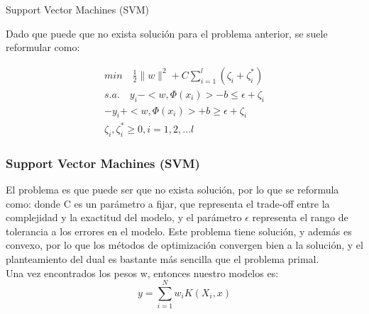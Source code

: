 \documentclass[spanish,xcolor=table]{beamer}
\begin{document}
\begin{section}{Support Vector Machines (SVM)}
\begin{frame}
Dado que puede que no exista soluci\'on para el problema anterior, se suele reformular como:

\begin{equation}\label{eq1}
  \begin{gathered}
    min \quad \frac{1}{2} \| w \|^2 + C \sum_{i=1}^{l} (\zeta_i +  \zeta_i^*) \\  
    s.a. \quad y_i- < w, \Phi(x_i) > -b \le \epsilon + \zeta_i\\
    -y_i+ < w, \Phi(x_i) > +b \geq \epsilon + \zeta_i\\
    \zeta_i,  \zeta_i^* \ge 0, i = 1, 2, \dots l
  \end{gathered}
\end{equation}
 


\end{frame}
\begin{frame}
\frametitle{Support Vector Machines (SVM)}

El problema es que puede ser que no exista soluci\'on, por lo que se reformula como:
donde C es un par\'ametro a fijar, que representa el trade-off entre la complejidad y la exactitud del modelo, y el par\'ametro $\epsilon$ representa el rango de tolerancia a los errores en el modelo. Este problema tiene soluci\'on, y adem\'as es convexo, por lo que los m\'etodos de optimizaci\'on convergen bien a la soluci\'on, y el planteamiento del dual es bastante m\'as sencilla que el problema primal.\\
\vspace{4mm}	
Una vez encontrados los pesos w, entonces nuestro modelos es:
\begin{equation*} 
y = \sum_{i=1}^{N} w_i K(X_i,x)
\end{equation*}

\end{frame}
\end{section}
\end{document}
